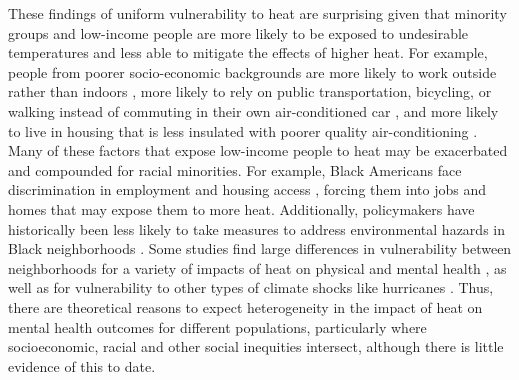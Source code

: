 \documentclass[titlepage]{article}
\begin{document}
These findings of uniform vulnerability to heat are surprising given that minority groups and low-income people are more likely to be exposed to undesirable temperatures and less able to mitigate the effects of higher heat. For example, people from poorer socio-economic backgrounds are more likely to work outside rather than indoors \citep{Gubernot2014Oct}, more likely to rely on public transportation, bicycling, or walking instead of commuting in their own air-conditioned car \citep{Karner2015Dec}, and more likely to live in housing that is less insulated with poorer quality air-conditioning \citep{Samuelson2020Jun}. Many of these factors that expose low-income people to heat may be exacerbated and compounded for racial minorities. For example, Black Americans face discrimination in employment \citep{Kang2016, Penner2008} and housing access \citep{Desmond2015, Akbar2019}, forcing them into jobs and homes that may expose them to more heat. Additionally, policymakers have historically been less likely to take measures to address environmental hazards in Black neighborhoods \citep{Banzhaf2019}. Some studies find large differences in vulnerability between neighborhoods for a variety of impacts of heat on physical and mental health \citep{Belanger2015Mar, Uejio2011Mar}, as well as for vulnerability to other types of climate shocks like hurricanes \citep{ferre2019hurricane, Gruebner2015Jun}. Thus, there are theoretical reasons to expect heterogeneity in the impact of heat on mental health outcomes for different populations, particularly where socioeconomic, racial and other social inequities intersect, although there is little evidence of this to date. 
\end{document}

